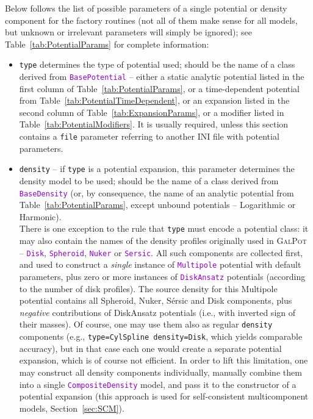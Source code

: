 \documentclass[12pt]{article}
\newcommand{\ttt}[1]{\textcolor{darkviolet}{\texttt{#1}}}
\newcommand{\ppp}[1]{\textcolor{darkolive} {\texttt{#1}}}
\begin{document}
Below follows the list of possible parameters of a single potential or density component for the factory routines (not all of them make sense for all models, but unknown or irrelevant parameters will simply be ignored); see Table~\ref{tab:PotentialParams} for complete information:
\begin{itemize}
\item \ppp{type}  determines the type of potential used; should be the name of a class derived from \ttt{BasePotential} -- either a static analytic potential listed in the first column of Table~\ref{tab:PotentialParams}, or a time-dependent potential from Table~\ref{tab:PotentialTimeDependent}, or an expansion listed in the second column of Table~\ref{tab:ExpansionParams}, or a modifier listed in Table~\ref{tab:PotentialModifiers}. It is usually required, unless this section contains a \ppp{file} parameter referring to another INI file with potential parameters.
\item  \ppp{density} -- if \ppp{type} is a potential expansion, this parameter determines the density model to be used; should be the name of a class derived from \ttt{BaseDensity} (or, by consequence, the name of an analytic potential from Table~\ref{tab:PotentialParams}, except unbound potentials -- Logarithmic or Harmonic).\\
\label{sec:PotentialGalpot}%
There is one exception to the rule that \ppp{type} must encode a potential class: it may also contain the names of the density profiles originally used in \textsc{GalPot} -- \ttt{Disk}, \ttt{Spheroid}, \ttt{Nuker} or \ttt{Sersic}. All such components are collected first, and used to construct a \textit{single} instance of \ttt{Multipole} potential with default parameters, plus zero or more instances of \ttt{DiskAnsatz} potentials (according to the number of disk profiles). The source density for this Multipole potential contains all Spheroid, Nuker, S\'ersic and Disk components, plus \textit{negative} contributions of DiskAnsatz potentials (i.e., with inverted sign of their masses). Of course, one may use them also as regular \ppp{density} components (e.g., \ppp{type=CylSpline density=Disk}, which yields comparable accuracy), but in that case each one would create a separate potential expansion, which is of course not efficient. In order to lift this limitation, one may construct all density components individually, manually combine them into a single \ttt{CompositeDensity} model, and pass it to the constructor of a potential expansion (this approach is used for self-consistent multicomponent models, Section~\ref{sec:SCM}).

\end{itemize}
\end{document}
